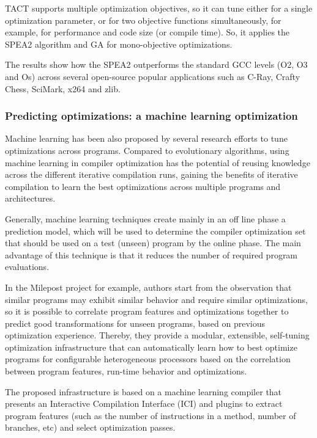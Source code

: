 TACT supports multiple optimization objectives, so it can tune either for a single optimization parameter, or for two objective functions simultaneously, for example, for performance and code size (or compile time). So, it applies the SPEA2 algorithm and GA for mono-objective optimizations.

The results show how the SPEA2 outperforms the standard GCC levels (O2, O3 and Os) across several open-source popular applications such as  C-Ray, Crafty Chess, SciMark, x264 and zlib.


 

\subsubsection{Predicting optimizations: a machine learning optimization}
Machine learning has been also proposed by several research efforts to tune optimizations across programs. Compared to evolutionary algorithms, using machine learning in compiler optimization has the potential of reusing knowledge across the different iterative compilation runs, gaining the benefits of iterative compilation to learn the best optimizations across multiple programs and architectures.

Generally, machine learning techniques create mainly in an off line phase a prediction model, which will be used to determine the compiler optimization set that should be used on a test (unseen) program by the online phase. The main advantage of this technique is that it reduces the number of required program evaluations.

In the Milepost project\cite{fursin2011milepost} for example, authors start from the observation that similar programs may exhibit similar behavior and require similar optimizations, so it is possible to correlate program features and optimizations together to predict good transformations for unseen programs, based on previous optimization experience. Thereby, they provide a modular, extensible, self-tuning optimization infrastructure that can automatically learn how to best optimize programs for configurable heterogeneous processors based on the correlation between program features, run-time behavior and optimizations. 

The proposed infrastructure is based on a machine learning compiler that presents an Interactive Compilation Interface (ICI) and plugins to extract program features (such as the number of instructions in a method, number of branches, etc) and select optimization passes. 

